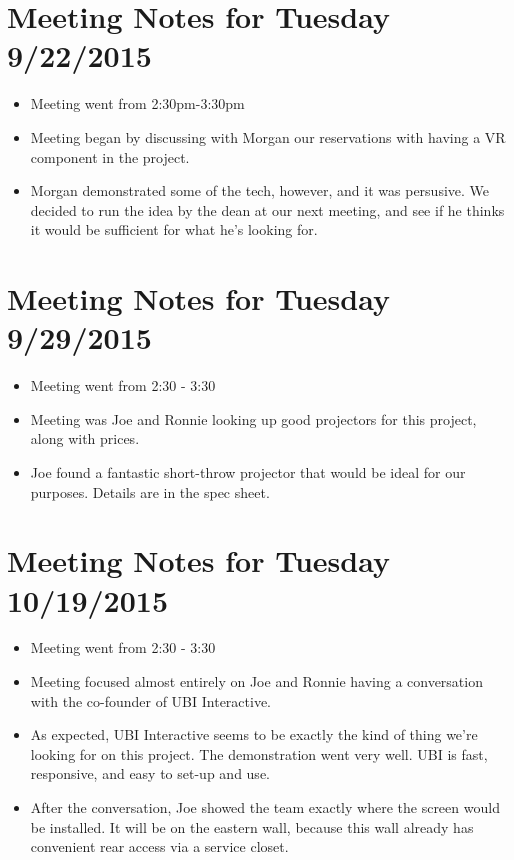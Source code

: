\documentclass[]{article}
\begin{document}
\section{Meeting Notes for Tuesday 9/22/2015}
	\begin{itemize}
		\item Meeting went from 2:30pm-3:30pm
	\end{itemize}
	\begin{itemize}
		\item Meeting began by discussing with Morgan our reservations with having a VR component in the project. 
		\item Morgan demonstrated some of the tech, however, and it was persusive. We decided to run the idea by 
		the dean at our next meeting, and see if he thinks it would be sufficient for what he's looking for. 
	\end{itemize}
	
\section{Meeting Notes for Tuesday 9/29/2015}
	\begin{itemize}
		\item Meeting went from 2:30 - 3:30
		\item Meeting was Joe and Ronnie looking up good projectors for this project, along with prices. 
		\item Joe found a fantastic short-throw projector that would be ideal for our purposes. Details are in the spec sheet. 
	
	\end{itemize}
	
\section{Meeting Notes for Tuesday 10/19/2015}
\begin{itemize}
	\item Meeting went from 2:30 - 3:30
	\item Meeting focused almost entirely on Joe and Ronnie having a conversation with the co-founder of UBI Interactive. 	\item As expected, UBI Interactive seems to be exactly the kind of thing we're looking for on this project. The demonstration went very well. UBI is fast, responsive, and easy to set-up and use. 
	\item After the conversation, Joe showed the team exactly where the screen would be installed. It will be on the eastern wall, because this wall already has convenient rear access via a service closet. 
	\end{itemize}
		
\end{document}
